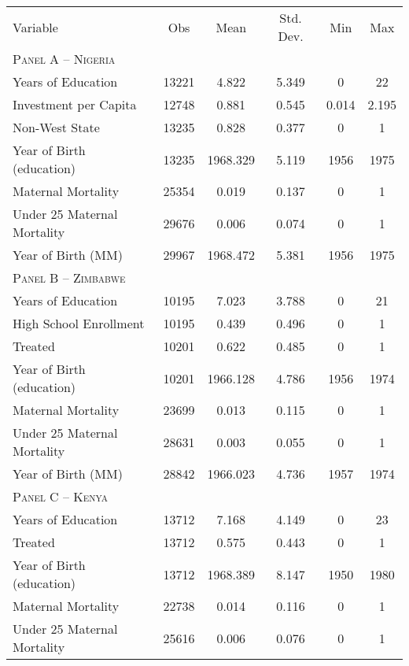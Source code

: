 \begin{subtables}
\begin{table}[htpb!]											
\begin{center}											
\begin{tabular}{l c c c c c}											
& & & & & \\											
\toprule											
Variable	&	Obs	&	Mean	&	Std. Dev.	&	Min	&	Max	\\
\midrule
\multicolumn{6}{l}{\textsc{Panel A – Nigeria}}  \\											
Years of Education	&	13221	&	4.822	&	5.349	&	0	&	22	\\
Investment per Capita	&	12748	&	0.881	&	0.545	&	0.014	&	2.195	\\
Non-West State	&	13235	&	0.828	&	0.377	&	0	&	1	\\
Year of Birth (education)	&	13235	&	1968.329	&	5.119	&	1956	&	1975	\\
Maternal Mortality	&	25354	&	0.019	&	0.137	&	0	&	1	\\
Under 25 Maternal Mortality	&	29676	&	0.006	&	0.074	&	0	&	1	\\
Year of Birth (MM)	&	29967	&	1968.472	&	5.381	&	1956	&	1975	\\
\midrule											
\multicolumn{6}{l}{\textsc{Panel B – Zimbabwe}}  \\											
Years of Education	&	10195	&	7.023	&	3.788	&	0	&	21	\\
High School Enrollment	&	10195	&	0.439	&	0.496	&	0	&	1	\\
Treated	&	10201	&	0.622	&	0.485	&	0	&	1	\\
Year of Birth (education)	&	10201	&	1966.128	&	4.786	&	1956	&	1974	\\
Maternal Mortality	&	23699	&	0.013	&	0.115	&	0	&	1	\\
Under 25 Maternal Mortality	&	28631	&	0.003	&	0.055	&	0	&	1	\\
Year of Birth (MM)	&	28842	&	1966.023	&	4.736	&	1957	&	1974	\\
\midrule											
\multicolumn{6}{l}{\textsc{Panel C – Kenya}}  \\											
Years of Education	&	13712	&	7.168	&	4.149	&	0	&	23	\\
Treated	&	13712	&	0.575	&	0.443	&	0	&	1	\\
Year of Birth (education)	&	13712	&	1968.389	&	8.147	&	1950	&	1980	\\
Maternal Mortality	&	22738	&	0.014	&	0.116	&	0	&	1	\\
Under 25 Maternal Mortality	&	25616	&	0.006	&	0.076	&	0	&	1	\\

\end{tabular}
\end{center}
\end{table}
\end{subtables}

